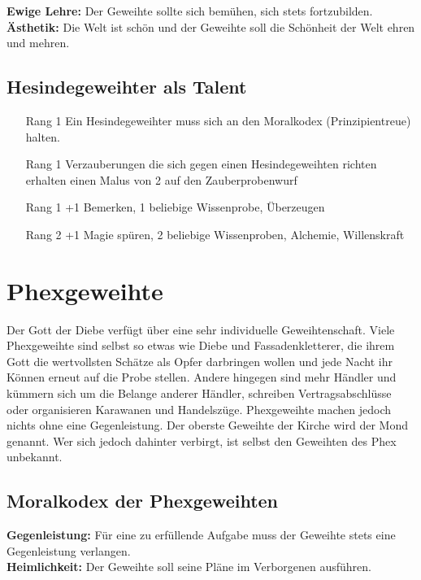 \documentclass[../../Heldenanleitung2]{subfiles}
\begin{document}
\noindent
\textbf{Ewige Lehre:} Der Geweihte sollte sich bemühen, sich
stets fortzubilden.\\

\noindent
\textbf{Ästhetik:} Die Welt ist schön und der Geweihte soll die
Schönheit der Welt ehren und mehren.

\subsection{Hesindegeweihter als Talent}
\begin{itemize}
	\item[Rang 1] Ein Hesindegeweihter muss sich an den Moralkodex
(Prinzipientreue) halten.
	\item[Rang 1] Verzauberungen die sich gegen einen Hesindegeweihten richten erhalten einen Malus von 2 auf den Zauberprobenwurf
	\item[Rang 1] +1 Bemerken, 1 beliebige Wissenprobe, Überzeugen
	\item[Rang 2] +1 Magie spüren, 2 beliebige Wissenproben, Alchemie, Willenskraft
\end{itemize}

\section{Phexgeweihte}

Der Gott der Diebe
verfügt über eine sehr
individuelle Geweihtenschaft.
Viele Phexgeweihte
sind selbst
so etwas wie Diebe und
Fassadenkletterer, die
ihrem Gott die wertvollsten
Schätze als Opfer
darbringen wollen und
jede Nacht ihr Können erneut
auf die Probe stellen.
Andere hingegen sind mehr Händler und kümmern sich
um die Belange anderer Händler, schreiben Vertragsabschlüsse
oder organisieren Karawanen und Handelszüge.
Phexgeweihte machen jedoch nichts ohne eine Gegenleistung.
Der oberste Geweihte der Kirche wird der Mond
genannt. Wer sich jedoch dahinter verbirgt, ist selbst
den Geweihten des Phex unbekannt.

\subsection{Moralkodex der Phexgeweihten}
\textbf{Gegenleistung:} Für eine zu erfüllende Aufgabe muss
der Geweihte stets eine Gegenleistung verlangen.\\

\noindent
\textbf{Heimlichkeit:} Der Geweihte soll seine Pläne im Verborgenen
ausführen.\\
\end{document}
